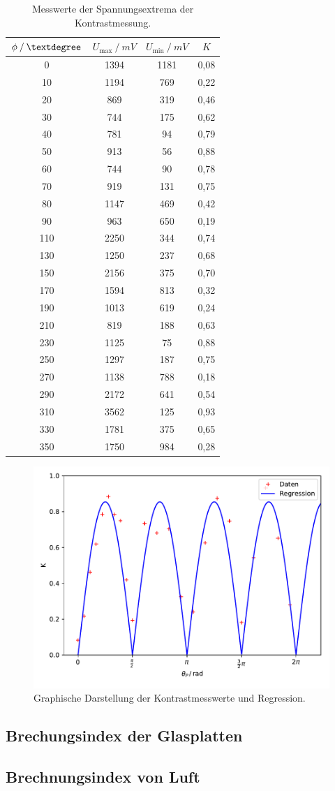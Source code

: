 \begin{table}[H]
\centering
\begin{tabular}{c|c|c|c}
{$\phi \:/\: \textdegree$} & {$U_\text{max} \:/\: \si{mV}$} & {$U_\text{min} \:/\: \si{mV}$} & {$K$}\\
\midrule
0 & 1394 & 1181 & 0,08 \\
10 & 1194 & 769 & 0,22 \\
20 & 869 & 319 & 0,46 \\
30 & 744 & 175 & 0,62 \\
40 & 781 & 94 & 0,79 \\
50 & 913 & 56 & 0,88 \\
60 & 744 & 90 & 0,78 \\
70 & 919 & 131 & 0,75 \\
80 & 1147 & 469 & 0,42 \\
90 & 963 & 650 & 0,19 \\
110 & 2250 & 344 & 0,74 \\
130 & 1250 & 237 & 0,68 \\
150 & 2156 & 375 & 0,70 \\
170 & 1594 & 813 & 0,32 \\
190 & 1013 & 619 & 0,24 \\
210 & 819 & 188 & 0,63 \\
230 & 1125 & 75 & 0,88 \\
250 & 1297 & 187 & 0,75 \\
270 & 1138 & 788 & 0,18 \\
290 & 2172 & 641 & 0,54 \\
310 & 3562 & 125 & 0,93 \\
330 & 1781 & 375 & 0,65 \\
350 & 1750 & 984 & 0,28 \\
\end{tabular}
\caption{Messwerte der Spannungsextrema der Kontrastmessung.}
\label{tab:kontrast}
\end{table}
\begin{figure}[H]
  \centering
  \includegraphics[scale=0.9]{bilder/kontrastplot.pdf}
  \caption{Graphische Darstellung der Kontrastmesswerte und Regression.}
  \label{fig:kontrastplot}
\end{figure}

\subsection{Brechungsindex der Glasplatten}


\subsection{Brechnungsindex von Luft}
